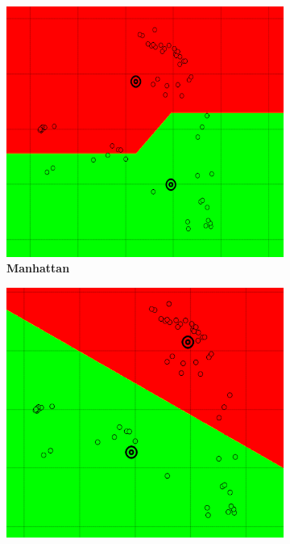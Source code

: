 \begin{figure} [ht]
\centering
	\begin{subfigure}[h]{0.23\textwidth}
    \centering
	\includegraphics[height=0.14\textheight]{./clustering/l1norm.png}
	\caption{\bf Manhattan}
	\end{subfigure}
    \begin{subfigure}[h]{0.23\textwidth}
    \centering
    \includegraphics[height=0.14\textheight]{./clustering/l2norm.png}

\end{subfigure}
\end{figure}
